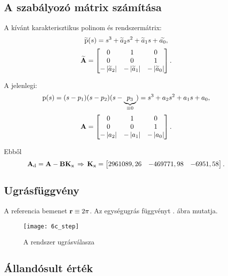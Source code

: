   
\subsection{A szabályozó mátrix számítása}

A kívánt karakterisztikus polinom és rendszermátrix:
\begin{equation}
	\widetilde{\mathrm{p}}(s) = s^3 + \widetilde{a}_2s^2 + \widetilde{a}_1s + \widetilde{a_0},
\end{equation}
\begin{equation}
	\widetilde{\boldsymbol{\mathrm{A}}} = \begin{bmatrix}0&1&0\\0&0&1\\-\left\lvert \widetilde{a}_2 \right\rvert&-\left\lvert \widetilde{a}_1 \right\rvert&-\left\lvert \widetilde{a}_0 \right\rvert\end{bmatrix}.
\end{equation}

A jelenlegi:
\begin{equation}
	\mathrm{p}(s) = (s-p_1)(s-p_2)(s-\underbrace{p_3}_{\equiv0}) = s^3 + a_2s^2 + a_1s + a_0,
\end{equation}
\begin{equation}
	\boldsymbol{\mathrm{A}} = \begin{bmatrix}0&1&0\\0&0&1\\-\left\lvert a_2 \right\rvert&-\left\lvert a_1 \right\rvert&-\left\lvert a_0 \right\rvert\end{bmatrix}.
\end{equation}

Ebből
\begin{equation}
	\boldsymbol{\mathrm{A}}_\text{d} = \boldsymbol{\mathrm{A}} - \boldsymbol{\mathrm{B}}\boldsymbol{\mathrm{K}}_\text{x}\,\Rightarrow\,\boldsymbol{\mathrm{K}}_\text{x} = \begin{bmatrix} 2961089,26& -469771,98& -6951,58\end{bmatrix}.
\end{equation}


\subsection{Ugrásfüggvény}

A referencia bemenet $\boldsymbol{\mathrm{r}}\equiv2\pi$. Az egységugrás függvényt . ábra mutatja.

\begin{figure}[H]
	\centering
	\texttt{[image: 6c\_step]}
	\caption{A rendszer ugrásválasza}
	\label{fig:6c_step}
\end{figure}


\subsection{Állandósult érték}\label{subsec:5d}

